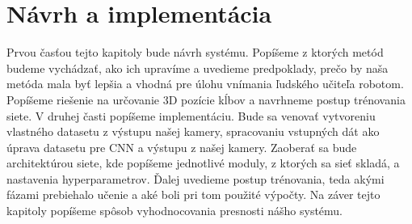\chapter{Návrh a implementácia}\label{chap:proposal_and_implementation}
Prvou časťou tejto kapitoly bude návrh systému. Popíšeme z ktorých metód budeme vychádzať, ako ich upravíme a uvedieme predpoklady, prečo by naša metóda mala byť lepšia a vhodná pre úlohu vnímania ľudského učiteľa robotom. Popíšeme riešenie na určovanie 3D pozície kĺbov a navrhneme postup trénovania siete. V druhej časti popíšeme implementáciu. Bude sa venovať vytvoreniu vlastného datasetu z výstupu našej kamery, spracovaniu vstupných dát ako úprava datasetu pre CNN a výstupu z našej kamery. Zaoberať sa bude architektúrou siete, kde popíšeme jednotlivé moduly, z ktorých sa sieť skladá, a nastavenia hyperparametrov. Ďalej uvedieme postup trénovania, teda akými fázami prebiehalo učenie a aké boli pri tom použité výpočty. Na záver tejto kapitoly popíšeme spôsob vyhodnocovania presnosti nášho systému.



